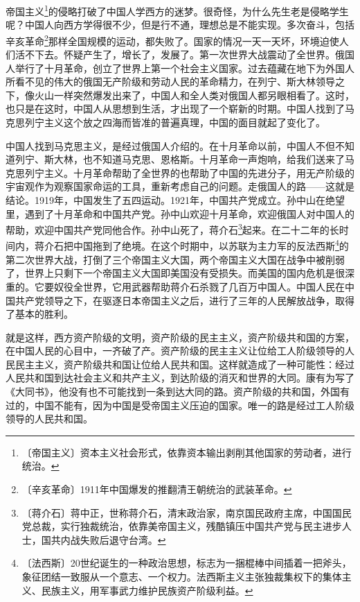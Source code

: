 \documentclass[12pt,UTF-8,openany]{ctexbook}
\begin{document}
\begin{normalsize}
    帝国主义\footnote{〔帝国主义〕资本主义社会形式，依靠资本输出剥削其他国家的劳动者，进行统治。}的侵略打破了中国人学西方的迷梦。很奇怪，为什么先生老是侵略学生呢？中国人向西方学得很不少，但是行不通，理想总是不能实现。多次奋斗，包括辛亥革命\footnote{〔辛亥革命〕1911年中国爆发的推翻清王朝统治的武装革命。}那样全国规模的运动，都失败了。国家的情况一天一天坏，环境迫使人们活不下去。怀疑产生了，增长了，发展了。第一次世界大战震动了全世界。俄国人举行了十月革命，创立了世界上第一个社会主义国家。过去蕴藏在地下为外国人所看不见的伟大的俄国无产阶级和劳动人民的革命精力，在列宁、斯大林领导之下，像火山一样突然爆发出来了，中国人和全人类对俄国人都另眼相看了。这时，也只是在这时，中国人从思想到生活，才出现了一个崭新的时期。中国人找到了马克思列宁主义这个放之四海而皆准的普遍真理，中国的面目就起了变化了。
    
    中国人找到马克思主义，是经过俄国人介绍的。在十月革命以前，中国人不但不知道列宁、斯大林，也不知道马克思、恩格斯。十月革命一声炮响，给我们送来了马克思列宁主义。十月革命帮助了全世界的也帮助了中国的先进分子，用无产阶级的宇宙观作为观察国家命运的工具，重新考虑自己的问题。走俄国人的路——这就是结论。1919年，中国发生了五四运动。1921年，中国共产党成立。孙中山在绝望里，遇到了十月革命和中国共产党。孙中山欢迎十月革命，欢迎俄国人对中国人的帮助，欢迎中国共产党同他合作。孙中山死了，蒋介石\footnote{〔蒋介石〕蒋中正，世称蒋介石，清末政治家，南京国民政府主席，中国国民党总裁，实行独裁统治，依靠美帝国主义，残酷镇压中国共产党与民主进步人士，国共内战失败后退守台湾。}起来。在二十二年的长时间内，蒋介石把中国拖到了绝境。在这个时期中，以苏联为主力军的反法西斯\footnote{〔法西斯〕20世纪诞生的一种政治思想，标志为一捆棍棒中间插着一把斧头，象征团结一致服从一个意志、一个权力。法西斯主义主张独裁集权下的集体主义、民族主义，用军事武力维护民族资产阶级利益。}的第二次世界大战，打倒了三个帝国主义大国，两个帝国主义大国在战争中被削弱了，世界上只剩下一个帝国主义大国即美国没有受损失。而美国的国内危机是很深重的。它要奴役全世界，它用武器帮助蒋介石杀戮了几百万中国人。中国人民在中国共产党领导之下，在驱逐日本帝国主义之后，进行了三年的人民解放战争，取得了基本的胜利。
    
    就是这样，西方资产阶级的文明，资产阶级的民主主义，资产阶级共和国的方案，在中国人民的心目中，一齐破了产。资产阶级的民主主义让位给工人阶级领导的人民民主主义，资产阶级共和国让位给人民共和国。这样就造成了一种可能性：经过人民共和国到达社会主义和共产主义，到达阶级的消灭和世界的大同。康有为写了《大同书》，他没有也不可能找到一条到达大同的路。资产阶级的共和国，外国有过的，中国不能有，因为中国是受帝国主义压迫的国家。唯一的路是经过工人阶级领导的人民共和国。
    
\end{normalsize}
\end{document}
